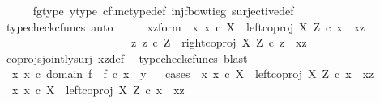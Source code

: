 \begin{isabellebody}
\ \ \ \ \isamarkupfalse%
\ fg{\isacharunderscore}{\kern0pt}type\ y{\isacharunderscore}{\kern0pt}type{}\ cfunc{\isacharunderscore}{\kern0pt}type{\isacharunderscore}{\kern0pt}def\ inj{\isacharunderscore}{\kern0pt}f{\isacharunderscore}{\kern0pt}bowtie{\isacharunderscore}{\kern0pt}g\ surjective{\isacharunderscore}{\kern0pt}def\ \isamarkupfalse%
\ {\isacharparenleft}{\kern0pt}typecheck{\isacharunderscore}{\kern0pt}cfuncs{\isacharcomma}{\kern0pt}\ auto{\isacharparenright}{\kern0pt}\isanewline
\ \ \isamarkupfalse%
\ \isamarkupfalse%
\ xz{\isacharunderscore}{\kern0pt}form{\isacharcolon}{\kern0pt}\ {\isachardoublequoteopen}{\isacharparenleft}{\kern0pt}{\isasymexists}\ x{\isachardot}{\kern0pt}\ x\ {\isasymin}\isactrlsub c\ X\ {\isasymand}\ left{\isacharunderscore}{\kern0pt}coproj\ X\ Z\ {\isasymcirc}\isactrlsub c\ x\ {\isacharequal}{\kern0pt}\ xz{\isacharparenright}{\kern0pt}\ {\isasymor}\ \ \isanewline
\ \ \ \ \ \ \ \ \ \ \ \ \ \ \ \ \ \ \ \ \ \ {\isacharparenleft}{\kern0pt}{\isasymexists}\ z{\isachardot}{\kern0pt}\ z\ {\isasymin}\isactrlsub c\ Z\ {\isasymand}\ right{\isacharunderscore}{\kern0pt}coproj\ X\ Z\ {\isasymcirc}\isactrlsub c\ z\ {\isacharequal}{\kern0pt}\ xz{\isacharparenright}{\kern0pt}{\isachardoublequoteclose}\isanewline
\ \ \ \ \isamarkupfalse%
\ coprojs{\isacharunderscore}{\kern0pt}jointly{\isacharunderscore}{\kern0pt}surj\ xz{\isacharunderscore}{\kern0pt}def\ \isamarkupfalse%
\ {\isacharparenleft}{\kern0pt}typecheck{\isacharunderscore}{\kern0pt}cfuncs{\isacharcomma}{\kern0pt}\ blast{\isacharparenright}{\kern0pt}\isanewline
\ \ \isamarkupfalse%
\ {\isachardoublequoteopen}{\isasymexists}\ x{\isachardot}{\kern0pt}\ x\ {\isasymin}\isactrlsub c\ domain\ f\ {\isasymand}\ f\ {\isasymcirc}\isactrlsub c\ x\ {\isacharequal}{\kern0pt}\ y{\isachardoublequoteclose}\isanewline
\ \ \isamarkupfalse%
{\isacharparenleft}{\kern0pt}cases\ {\isachardoublequoteopen}{\isasymexists}\ x{\isachardot}{\kern0pt}\ x\ {\isasymin}\isactrlsub c\ X\ {\isasymand}\ left{\isacharunderscore}{\kern0pt}coproj\ X\ Z\ {\isasymcirc}\isactrlsub c\ x\ {\isacharequal}{\kern0pt}\ xz{\isachardoublequoteclose}{\isacharparenright}{\kern0pt}\isanewline
\ \ \ \ \isamarkupfalse%
\ {\isachardoublequoteopen}{\isasymexists}\ x{\isachardot}{\kern0pt}\ x\ {\isasymin}\isactrlsub c\ X\ {\isasymand}\ left{\isacharunderscore}{\kern0pt}coproj\ X\ Z\ {\isasymcirc}\isactrlsub c\ x\ {\isacharequal}{\kern0pt}\ xz{\isachardoublequoteclose}\isanewline

\end{isabellebody}
